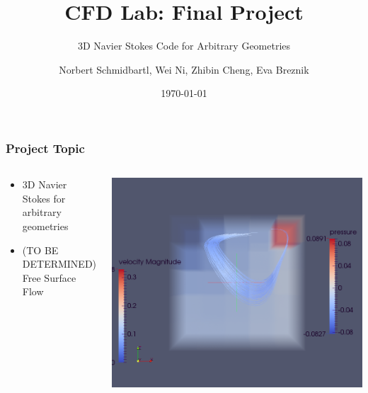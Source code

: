 \documentclass{beamer}
\title{CFD Lab: Final Project}
\subtitle{3D Navier Stokes Code for Arbitrary Geometries}    %
\author{Norbert Schmidbartl, Wei Ni, Zhibin Cheng, Eva Breznik}
\institute[TUM]{Technische Universit\"{a}t M\"{u}nchen \\ Fakult\"{a}t f\"{u}r Informatik}
\date{\today}
\begin{document}
\begin{frame}
\maketitle %
\end{frame}





\begin{frame}
\frametitle{Project Topic}

\begin{columns}
\begin{column}{0.48\textwidth}
\begin{itemize}
\item 3D Navier Stokes for arbitrary geometries
\item (TO BE DETERMINED) Free Surface Flow
\end{itemize} \end{column}
\begin{column}{0.48\textwidth}
\includegraphics[height = 0.45\textheight]{simpleCavity.png}
\end{column}
\end{columns}
\end{frame}
\end{document}
